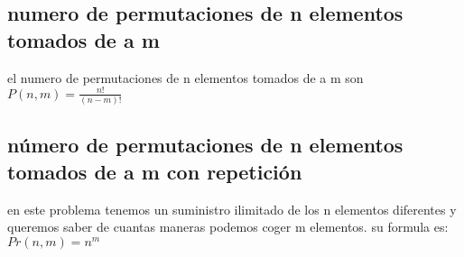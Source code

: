 \subsection{numero de permutaciones de n elementos tomados de a m}
el numero de permutaciones de n elementos tomados de a m son
$P(n,m)=\frac{n!}{\left (n-m  \right )!}$
\subsection{número de permutaciones de n elementos tomados de a m con repetición}
en este problema tenemos un suministro ilimitado de los n elementos diferentes y queremos saber de cuantas maneras podemos coger m elementos. su formula es:
$Pr(n,m)=n^{m}$
